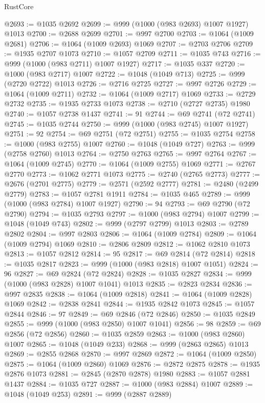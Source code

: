 \begin{lexlean}{RustCore}
\begin{coremodule}
@2693 := @1035 @2692
@2699 := @999 (@1000 (@983 @2693) @1007 @1927) @1013
@2700 := @2688 @2699
@2701 := @997 @2700
@2703 := @1064 (@1009 @2681)
@2706 := @1064 (@1009 @2693) @1069
@2707 := @2703 @2706
@2709 := @1935 @2707 @1073
@2710 := @1057 @2709
@2711 := @1035 @743
@2716 := @999 (@1000 (@983 @2711) @1007 @1927)
@2717 := @1035 @337
@2720 := @1000 (@983 @2717) @1007
@2722 := @1048 (@1049 @713)
@2725 := @999 (@2720 @2722) @1013
@2726 := @2716 @2725
@2727 := @997 @2726
@2729 := @1064 (@1009 @2711)
@2732 := @1064 (@1009 @2717) @1069
@2733 := @2729 @2732
@2735 := @1935 @2733 @1073
@2738 := @2710 (@2727 @2735) @1980
@2740 := @1057 @2738 @1437
@2741 := 91
@2744 := @69 @2741 (@72 @2741)
@2745 := @1035 @2744
@2750 := @999 (@1000 (@983 @2745) @1007 @1927)
@2751 := 92
@2754 := @69 @2751 (@72 @2751)
@2755 := @1035 @2754
@2758 := @1000 (@983 @2755) @1007
@2760 := @1048 (@1049 @727)
@2763 := @999 (@2758 @2760) @1013
@2764 := @2750 @2763
@2765 := @997 @2764
@2767 := @1064 (@1009 @2745)
@2770 := @1064 (@1009 @2755) @1069
@2771 := @2767 @2770
@2773 := @1062 @2771 @1073
@2775 := @2740 (@2765 @2773)
@2777 := @2676 (@2701 @2775)
@2779 := @2571 (@2592 @2777)
@2781 := @2480 (@2499 @2779)
@2783 := @1057 @2781 @1911
@2784 := @1035 @465
@2789 := @999 (@1000 (@983 @2784) @1007 @1927)
@2790 := 94
@2793 := @69 @2790 (@72 @2790)
@2794 := @1035 @2793
@2797 := @1000 (@983 @2794) @1007
@2799 := @1048 (@1049 @743)
@2802 := @999 (@2797 @2799) @1013
@2803 := @2789 @2802
@2804 := @997 @2803
@2806 := @1064 (@1009 @2784)
@2809 := @1064 (@1009 @2794) @1069
@2810 := @2806 @2809
@2812 := @1062 @2810 @1073
@2813 := @1057 @2812
@2814 := 95
@2817 := @69 @2814 (@72 @2814)
@2818 := @1035 @2817
@2823 := @999 (@1000 (@983 @2818) @1007 @1051)
@2824 := 96
@2827 := @69 @2824 (@72 @2824)
@2828 := @1035 @2827
@2834 := @999 (@1000 (@983 @2828) @1007 @1041) @1013
@2835 := @2823 @2834
@2836 := @997 @2835
@2838 := @1064 (@1009 @2818)
@2841 := @1064 (@1009 @2828) @1069
@2842 := @2838 @2841
@2844 := @1935 @2842 @1073
@2845 := @1057 @2844
@2846 := 97
@2849 := @69 @2846 (@72 @2846)
@2850 := @1035 @2849
@2855 := @999 (@1000 (@983 @2850) @1007 @1041)
@2856 := 98
@2859 := @69 @2856 (@72 @2856)
@2860 := @1035 @2859
@2863 := @1000 (@983 @2860) @1007
@2865 := @1048 (@1049 @233)
@2868 := @999 (@2863 @2865) @1013
@2869 := @2855 @2868
@2870 := @997 @2869
@2872 := @1064 (@1009 @2850)
@2875 := @1064 (@1009 @2860) @1069
@2876 := @2872 @2875
@2878 := @1935 @2876 @1073
@2881 := @2845 (@2870 @2878) @1980
@2883 := @1057 @2881 @1437
@2884 := @1035 @727
@2887 := @1000 (@983 @2884) @1007
@2889 := @1048 (@1049 @253)
@2891 := @999 (@2887 @2889)

\end{coremodule}
\end{lexlean}
